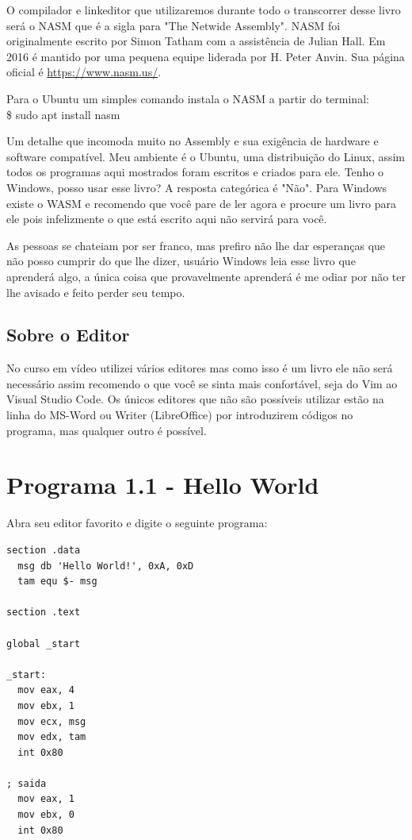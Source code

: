 O compilador e linkeditor que utilizaremos durante todo o transcorrer desse livro será o NASM que é a sigla para "The Netwide Assembly". NASM foi originalmente escrito por Simon Tatham com a assistência de Julian Hall. Em 2016 é mantido por uma pequena equipe liderada por H. Peter Anvin. Sua página oficial é \url{https://www.nasm.us/}.

Para o Ubuntu um simples comando instala o NASM a partir do terminal:\\
{\ttfamily\$ sudo apt install nasm}
\\[2mm]
\begin{dica}
	Um detalhe que incomoda muito no Assembly e sua exigência de hardware e software compatível. Meu ambiente é o Ubuntu, uma distribuição do Linux, assim todos os programas aqui mostrados foram escritos e criados para ele. Tenho o Windows, posso usar esse livro? A resposta categórica é "Não". Para Windows existe o WASM e recomendo que você pare de ler agora e procure um livro para ele pois infelizmente o que está escrito aqui não servirá para você.
\end{dica}

As pessoas se chateiam por ser franco, mas prefiro não lhe dar esperanças que não posso cumprir do que lhe dizer, usuário Windows leia esse livro que aprenderá algo, a única coisa que provavelmente aprenderá é me odiar por não ter lhe avisado e feito perder seu tempo.

\subsection{Sobre o Editor}

No curso em vídeo utilizei vários editores mas como isso é um livro ele não será necessário assim recomendo o que você se sinta mais confortável, seja do Vim ao Visual Studio Code. Os únicos editores que não são possíveis utilizar estão na linha do MS-Word ou Writer (LibreOffice) por introduzirem códigos no programa, mas qualquer outro é possível.

\section{Programa 1.1 - Hello World}
Abra seu editor favorito e digite o seguinte programa:
\begin{lstlisting}[]
section .data
  msg db 'Hello World!', 0xA, 0xD
  tam equ $- msg

section .text

global _start

_start:
  mov eax, 4
  mov ebx, 1
  mov ecx, msg
  mov edx, tam
  int 0x80

; saida
  mov eax, 1
  mov ebx, 0
  int 0x80
\end{lstlisting}

